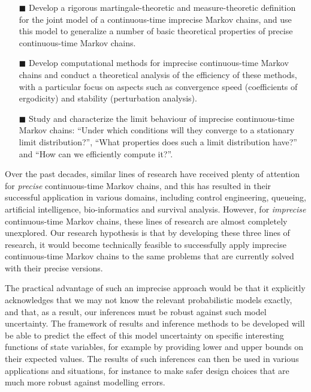 \documentclass[11pt,dvipsnames,usenames,a4paper]{article}
\begin{document}
\vspace{6pt}
\begin{itemize}
\item[\tiny$\blacksquare$]
Develop a rigorous martingale-theoretic and measure-theoretic definition for the joint model of a continuous-time imprecise Markov chains, and use this model to generalize a number of basic theoretical properties of precise continuous-time Markov chains.
\item[\tiny$\blacksquare$]
Develop computational methods for imprecise continuous-time Markov chains and conduct a theoretical analysis of the efficiency of these methods, with a particular focus on aspects such as convergence speed (coefficients of ergodicity) and stability (perturbation analysis).
\item[\tiny$\blacksquare$]
Study and characterize the limit behaviour of imprecise continuous-time Markov chains: ``Under which conditions will they converge to a stationary limit distribution?'', ``What properties does such a limit distribution have?'' and ``How can we efficiently compute it?''. 
\end{itemize}
\vspace{6pt}

Over the past decades, similar lines of research have received plenty of attention for \emph{precise} continuous-time Markov chains, and this has resulted in their successful application in various domains, including control engineering, queueing, artificial intelligence, bio-informatics and survival analysis.
However, for \emph{imprecise} continuous-time Markov chains, these lines of research are almost completely unexplored.
Our research hypothesis is that by developing these three lines of research, it would become technically feasible to successfully apply imprecise continuous-time Markov chains to the same problems that are currently solved with their precise versions.

The practical advantage of such an imprecise approach would be that it explicitly acknowledges that we may not know the relevant probabilistic models exactly, and that, as a result, our inferences must be robust against such model uncertainty. 
The framework of results and inference methods to be developed will be able to predict the effect of this model uncertainty on specific interesting functions of state variables, for example by providing lower and upper bounds on their expected values. 
The results of such inferences can then be used in various applications and situations, for instance to make safer design choices that are much more robust against modelling errors.
\end{document}
